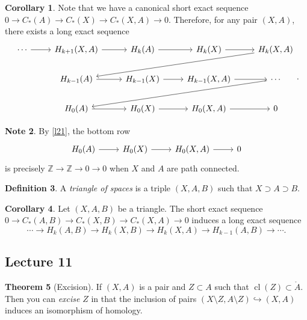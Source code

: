 \documentclass[10pt,letterpaper,cm]{nupset}
\theoremstyle{definition}
\newtheorem{definition}{Definition}[subsection]
\newtheorem{note}[definition]{Note}
\theoremstyle{theorem}
\newtheorem{theorem}[definition]{Theorem}
\newtheorem{corollary}[definition]{Corollary}
\theoremstyle{remark}
\newcommand{\Z}{\mathbb Z}
\newcommand{\1}{\mathbb{1}}
\newcommand{\0}{\vec 0}
\DeclareMathOperator{\cl}{cl}
\begin{document}
\begin{corollary}\label{c11}
Note that we have a canonical short exact sequence $0 \to C_{\ast}(A) \to C_{\ast}(X) \to C_{\ast}(X,A) \to 0$. Therefore, for any pair $(X,A)$, there exists a long exact sequence
\[
\begin{tikzcd}
\cdots \arrow[r] & {H_{k+1}(X,A)} \arrow[r] & H_k(A) \arrow[r]     & H_k(X) \arrow[r]         & {H_k(X,A)} \arrow[llld] \\
                 & H_{k-1}(A) \arrow[r]     & H_{k-1}(X) \arrow[r] & {H_{k-1}(X,A)} \arrow[r] & \cdots \arrow[llld]     \\
                 & H_0(A) \arrow[r]         & H_0(X) \arrow[r]     & {H_0(X,A)} \arrow[r]     & 0                      
\end{tikzcd}
.\]
\end{corollary}

\begin{note} By \cref{l21}, the bottom row
\[
\begin{tikzcd}
H_0(A) \arrow[r]         & H_0(X) \arrow[r]     & {H_0(X,A)} \arrow[r]     & 0
\end{tikzcd}
\] is precisely $\Z \to \Z \to 0 \to 0$ when $X$ and $A$ are path connected.
\end{note}

\begin{definition}
A \textit{triangle of spaces} is a triple $(X, A, B)$ such that $X \supset A \supset B$.
\end{definition}

\begin{corollary}\label{c12}
Let $(X, A, B)$ be a triangle. The short exact sequence $0 \to C_{\ast}(A, B) \to C_{\ast}(X, B) \to C_{\ast}(X, A) \to 0$ induces a long exact sequence $$ \cdots \to  H_k(A, B) \to H_k(X, B) \to H_k(X, A) \to H_{k-1}(A, B) \to \cdots   .$$
\end{corollary}

\subsection{Lecture 11}

\begin{theorem}[Excision]
If $(X, A)$ is a pair and $Z\subset A$ such that $\cl(Z) \subset \mathring{A}$. Then you can \textit{excise} $Z$ in that the inclusion of pairs $(X\setminus Z, A \setminus Z) \hookrightarrow (X, A)$ induces an isomorphism of homology. 
\end{theorem}
\end{document}
